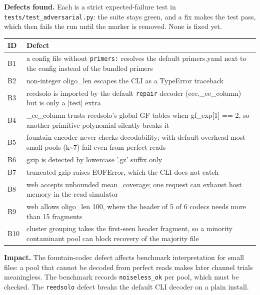 \documentclass[11pt,a4paper]{article}
\newcommand{\note}[1]{\par\noindent\colorbox{light}{\parbox{\dimexpr\linewidth-2\fboxsep\relax}{\small #1}}\par}
\begin{document}
\textbf{Defects found.} Each is a strict expected-failure test in
\texttt{tests/test\_adversarial.py}: the suite stays green, and a fix makes the test pass,
which then fails the run until the marker is removed. None is fixed yet.
\begin{center}\small
\begin{tabularx}{\linewidth}{lY}
\toprule
ID & Defect\\
\midrule
B1 & a config file without \texttt{primers:} resolves the default primers.yaml next to the config instead of the bundled primers \\
B2 & non-integer oligo\_len escapes the CLI as a TypeError traceback \\
B3 & reedsolo is imported by the default \texttt{repair} decoder (ecc.\_ee\_column) but is only a [test] extra \\
B4 & \_ee\_column trusts reedsolo's global GF tables when gf\_exp[1] == 2, so another primitive polynomial silently breaks it \\
B5 & fountain encoder never checks decodability; with default overhead most small pools (k\textasciitilde{}7) fail even from perfect reads \\
B6 & gzip is detected by lowercase '.gz' suffix only \\
B7 & truncated gzip raises EOFError, which the CLI does not catch \\
B8 & web accepts unbounded mean\_coverage; one request can exhaust host memory in the read simulator \\
B9 & web allows oligo\_len 100, where the header of 5 of 6 codecs needs more than 15 fragments \\
B10 & cluster grouping takes the first-seen header fragment, so a minority contaminant pool can block recovery of the majority file \\
\bottomrule
\end{tabularx}
\end{center}
\note{\textbf{Impact.} The fountain-codec defect affects benchmark interpretation for small
files: a pool that cannot be decoded from perfect reads makes later channel trials
meaningless. The benchmark records \texttt{noiseless\_ok} per pool, which must be checked.
The \texttt{reedsolo} defect breaks the default CLI decoder on a plain install.}
\end{document}

